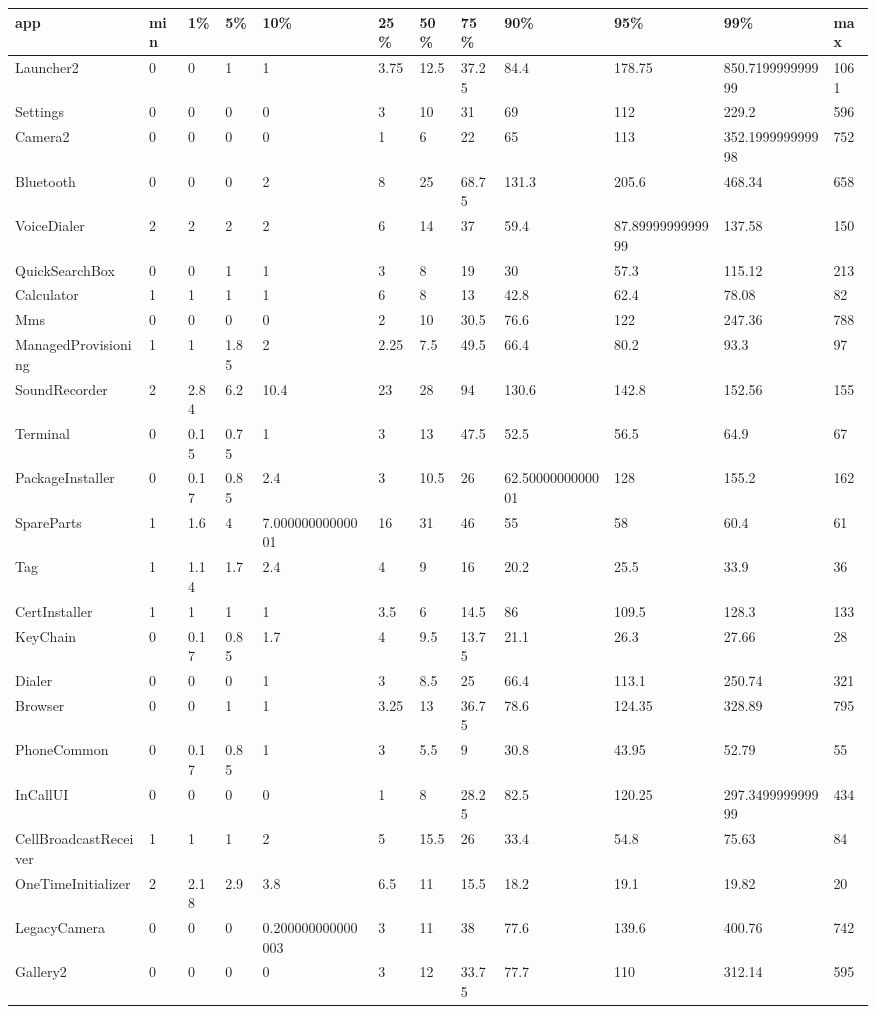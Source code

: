 \documentclass[a4paper]{article}
\begin{document}
\begin{tabular}{|l|l|l|l|l|l|l|l|l|l|l|l|}
\hline
app&min&1\%&5\%&10\%&25\%&50\%&75\%&90\%&95\%&99\%&max\\
\hline
Launcher2&0&0&1&1&3.75&12.5&37.25&84.4&178.75&850.719999999999&1061\\
\hline
Settings&0&0&0&0&3&10&31&69&112&229.2&596\\
\hline
Camera2&0&0&0&0&1&6&22&65&113&352.199999999998&752\\
\hline
Bluetooth&0&0&0&2&8&25&68.75&131.3&205.6&468.34&658\\
\hline
VoiceDialer&2&2&2&2&6&14&37&59.4&87.8999999999999&137.58&150\\
\hline
QuickSearchBox&0&0&1&1&3&8&19&30&57.3&115.12&213\\
\hline
Calculator&1&1&1&1&6&8&13&42.8&62.4&78.08&82\\
\hline
Mms&0&0&0&0&2&10&30.5&76.6&122&247.36&788\\
\hline
ManagedProvisioning&1&1&1.85&2&2.25&7.5&49.5&66.4&80.2&93.3&97\\
\hline
SoundRecorder&2&2.84&6.2&10.4&23&28&94&130.6&142.8&152.56&155\\
\hline
Terminal&0&0.15&0.75&1&3&13&47.5&52.5&56.5&64.9&67\\
\hline
PackageInstaller&0&0.17&0.85&2.4&3&10.5&26&62.5000000000001&128&155.2&162\\
\hline
SpareParts&1&1.6&4&7.00000000000001&16&31&46&55&58&60.4&61\\
\hline
Tag&1&1.14&1.7&2.4&4&9&16&20.2&25.5&33.9&36\\
\hline
CertInstaller&1&1&1&1&3.5&6&14.5&86&109.5&128.3&133\\
\hline
KeyChain&0&0.17&0.85&1.7&4&9.5&13.75&21.1&26.3&27.66&28\\
\hline
Dialer&0&0&0&1&3&8.5&25&66.4&113.1&250.74&321\\
\hline
Browser&0&0&1&1&3.25&13&36.75&78.6&124.35&328.89&795\\
\hline
PhoneCommon&0&0.17&0.85&1&3&5.5&9&30.8&43.95&52.79&55\\
\hline
InCallUI&0&0&0&0&1&8&28.25&82.5&120.25&297.349999999999&434\\
\hline
CellBroadcastReceiver&1&1&1&2&5&15.5&26&33.4&54.8&75.63&84\\
\hline
OneTimeInitializer&2&2.18&2.9&3.8&6.5&11&15.5&18.2&19.1&19.82&20\\
\hline
LegacyCamera&0&0&0&0.200000000000003&3&11&38&77.6&139.6&400.76&742\\
\hline
Gallery2&0&0&0&0&3&12&33.75&77.7&110&312.14&595\\

\end{tabular}
\end{document}
